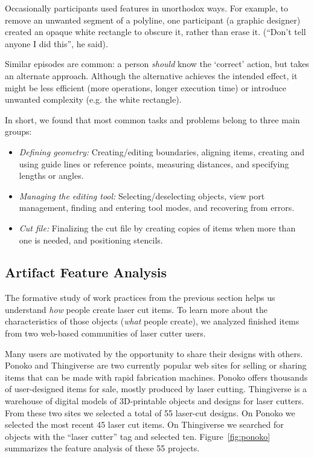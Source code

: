 \documentclass{article}
\begin{document}
Occasionally participants used features in unorthodox ways. For
example, to remove an unwanted segment of a polyline, one participant
(a graphic designer) created an opaque white rectangle to obscure it,
rather than erase it. (``Don't tell anyone I did this'', he said).

Similar episodes are common: a person \textit{should} know the
`correct' action, but takes an alternate approach. Although the
alternative achieves the intended effect, it might be less efficient
(more operations, longer execution time) or introduce unwanted
complexity (e.g. the white rectangle).

In short, we found that most common tasks and problems belong to three
main groups:

\begin{itemize}
\item \textit{Defining geometry:} Creating/editing boundaries,
  aligning items, creating and using guide lines or reference points,
  measuring distances, and specifying lengths or angles.
\item \textit{Managing the editing tool:} Selecting/deselecting
  objects, view port management, finding and entering tool modes, and
  recovering from errors.
\item \textit{Cut file:} Finalizing the cut file by creating copies of
  items when more than one is needed, and positioning stencils.
\end{itemize}

\subsection{Artifact Feature Analysis}

The formative study of work practices from the previous section helps
us understand \textit{how} people create laser cut items. To learn
more about the characteristics of those objects (\textit{what} people
create), we analyzed finished items from two web-based communities of
laser cutter users.

Many users are motivated by the opportunity to share their designs
with others. Ponoko and Thingiverse are two currently popular web
sites for selling or sharing items that can be made with rapid
fabrication machines. Ponoko offers thousands of user-designed items
for sale, mostly produced by laser cutting. Thingiverse is a warehouse
of digital models of 3D-printable objects and designs for laser
cutters. From these two sites we selected a total of 55 laser-cut
designs. On Ponoko we selected the most recent 45 laser cut items.  On
Thingiverse we searched for objects with the ``laser cutter'' tag and
selected ten. Figure~\ref{fig:ponoko} summarizes the feature analysis
of these 55 projects.
\end{document}
